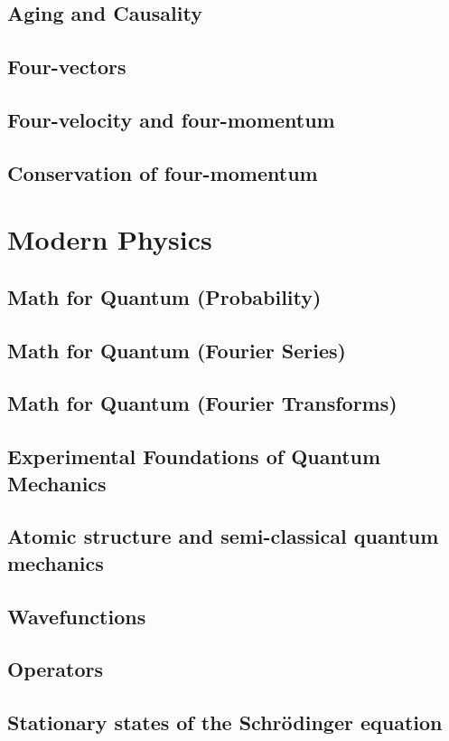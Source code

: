 \documentclass{article}
\begin{document}
\subsection{Aging and Causality}
\subsection{Four-vectors}
\subsection{Four-velocity and four-momentum}
\subsection{Conservation of four-momentum}

\section{Modern Physics}
\subsection{Math for Quantum (Probability)}
\subsection{Math for Quantum (Fourier Series)}
\subsection{Math for Quantum (Fourier Transforms)}
\subsection{Experimental Foundations of Quantum Mechanics}
\subsection{Atomic structure and semi-classical quantum mechanics}
\subsection{Wavefunctions}
\subsection{Operators}
\subsection{Stationary states of the Schrödinger equation}
\end{document}
